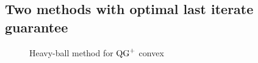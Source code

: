     \subsection{Two methods with optimal last iterate guarantee}\label{subsec:proposed_methods}

        \begin{wrapfigure}[8]{R}{0.5\textwidth}
            \begin{minipage}{0.5\textwidth}
                \vspace{-0.9cm}
                \SetInd{0.5em}{0.3em}
                \begin{algorithm}[H]
                    \caption{Heavy-ball method for $\operatorname{QG}^+$ convex}
                    \label{alg:ogm}
                \end{algorithm}
            \end{minipage}
        \end{wrapfigure}

